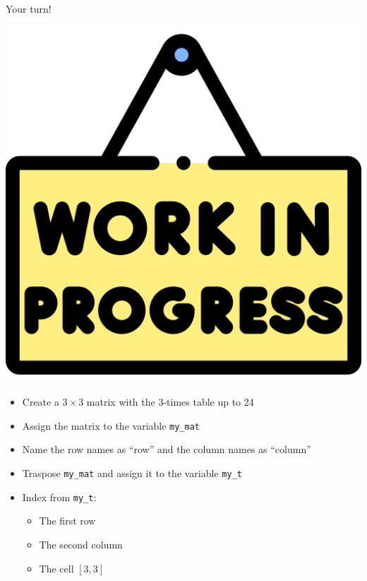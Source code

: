 \documentclass[
  ignorenonframetext,
]{beamer}
\providecommand{\tightlist}{%
  \setlength{\itemsep}{0pt}\setlength{\parskip}{0pt}}
\begin{document}
\begin{frame}[fragile]{Your turn!}
\protect\hypertarget{your-turn-3}{}
\begin{center}\includegraphics[width=0.19\linewidth]{img/work} \end{center}

\begin{itemize}
\tightlist
\item
  Create a \(3 \times 3\) matrix with the 3-times table up to 24
\item
  Assign the matrix to the variable \texttt{my\_mat}
\item
  Name the row names as ``row'' and the column names as ``column''
\item
  Traspose \texttt{my\_mat} and assign it to the variable \texttt{my\_t}
\item
  Index from \texttt{my\_t}:

  \begin{itemize}
  \tightlist
  \item
    The first row
  \item
    The second column
  \item
    The cell \([3, 3]\)
  \end{itemize}
\end{itemize}
\end{frame}
\end{document}
